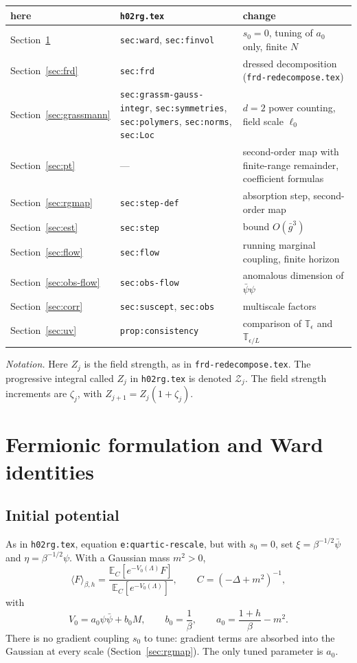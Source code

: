 \documentclass[11pt]{amsart}
\theoremstyle{definition}
\theoremstyle{remark}
\numberwithin{equation}{section}
\newcommand{\E}{\mathbb{E}}
\newcommand{\T}{\mathbb{T}}
\newcommand{\cZ}{\mathcal{Z}}
\newcommand{\avg}[1]{\langle #1\rangle}
\newcommand{\frd}{\texttt{frd-redecompose.tex}}
\newcommand{\hr}{\texttt{h02rg.tex}}
\begin{document}
\medskip
\begin{center}\small
\begin{tabular}{l|p{5.2cm}|p{5.2cm}}
here & \hr{} & change\\\hline
Section~\ref{sec:ward} & \texttt{sec:ward}, \texttt{sec:finvol} & $s_0=0$, tuning of $a_0$ only, finite $N$\\
Section~\ref{sec:frd} & \texttt{sec:frd} & dressed decomposition (\frd)\\
Section~\ref{sec:grassmann} & \texttt{sec:grassm-gauss-integr}, \texttt{sec:symmetries}, \texttt{sec:polymers}, \texttt{sec:norms}, \texttt{sec:Loc} & $d=2$ power counting, field scale $\ell_0$\\
Section~\ref{sec:pt} & --- & second-order map with finite-range remainder, coefficient formulas\\
Section~\ref{sec:rgmap} & \texttt{sec:step-def} & absorption step, second-order map\\
Section~\ref{sec:est} & \texttt{sec:step} & bound $O(\bar g^3)$\\
Section~\ref{sec:flow} & \texttt{sec:flow} & running marginal coupling, finite horizon\\
Section~\ref{sec:obs-flow} & \texttt{sec:obs-flow} & anomalous dimension of $\bar\psi\psi$\\
Section~\ref{sec:corr} & \texttt{sec:suscept}, \texttt{sec:obs} & multiscale factors\\
Section~\ref{sec:uv} & \texttt{prop:consistency} & comparison of $\T_\epsilon$ and $\T_{\epsilon/L}$
\end{tabular}
\end{center}
\medskip

\emph{Notation.} Here $Z_j$ is the field strength, as in \frd{}. The progressive integral called
$Z_j$ in \hr{} is denoted $\cZ_j$. The field strength increments are $\zeta_j$, with
$Z_{j+1}=Z_j(1+\zeta_j)$.

\section{Fermionic formulation and Ward identities}
\label{sec:ward}

\subsection{Initial potential}
As in \hr{}, equation \texttt{e:quartic-rescale}, but with $s_0=0$, set
$\xi=\beta^{-1/2}\bar\psi$ and $\eta=\beta^{-1/2}\psi$. With a Gaussian mass $m^2>0$,
\begin{equation}\label{e:V0}
  \avg{F}_{\beta,h}=\frac{\E_C[e^{-V_0(\Lambda)}F]}{\E_C[e^{-V_0(\Lambda)}]},\qquad
  C=(-\Delta+m^2)^{-1},
\end{equation}
with
\begin{equation}\label{e:V0b}
  V_0=a_0\psi\bar\psi+b_0M,\qquad b_0=\frac1\beta,\qquad a_0=\frac{1+h}{\beta}-m^2 .
\end{equation}
There is no gradient coupling $s_0$ to tune: gradient terms are absorbed into the Gaussian at
every scale (Section~\ref{sec:rgmap}). The only tuned parameter is $a_0$.
\end{document}
